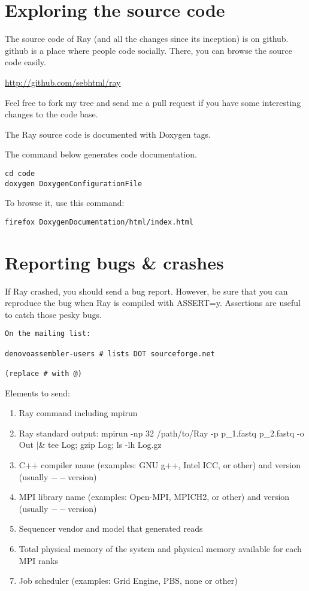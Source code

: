 \documentclass{article}
\begin{document}
\section{Exploring the source code}

The source code of Ray (and all the changes since its inception) is on github.
github is a place where people code socially.
There, you can browse the source code easily.

\href{http://github.com/sebhtml/ray}{http://github.com/sebhtml/ray}

Feel free to fork my tree and send me a pull request if you have some
interesting changes to the code base.

The Ray source code is documented with Doxygen tags.

The command below generates code documentation.

\begin{verbatim}
cd code
doxygen DoxygenConfigurationFile
\end{verbatim}

To browse it, use this command:

\begin{verbatim}
firefox DoxygenDocumentation/html/index.html
\end{verbatim}

\section{Reporting bugs \& crashes}

If Ray crashed, you should send a bug report.
However, be sure that you can reproduce the bug when Ray is compiled with
ASSERT=y. Assertions are useful to catch those pesky bugs.

\begin{verbatim}
On the mailing list:

denovoassembler-users # lists DOT sourceforge.net

(replace # with @)

\end{verbatim}

\noindent
Elements to send:

\begin{enumerate}
 \item Ray command including mpirun
  \item Ray standard output: mpirun -np 32 /path/to/Ray -p p\_1.fastq p\_2.fastq -o Out $|$\& tee Log; gzip Log; ls -lh Log.gz
    \item  C++ compiler name (examples: GNU g++, Intel ICC, or other) and version (usually $--$version)
   \item  MPI library name (examples: Open-MPI, MPICH2, or other) and version (usually $--$version)
    \item  Sequencer vendor and model that generated reads
    \item  Total physical memory of the system and physical memory available for each MPI ranks
\item Job scheduler (examples: Grid Engine, PBS, none or other)
\end{enumerate}
\end{document}
